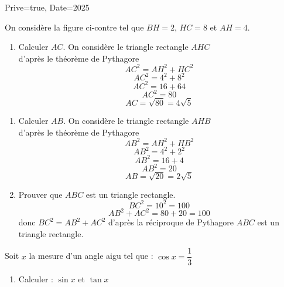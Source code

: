 \documentclass[a4paper,12pt]{article}
\begin{document}
\begin{Maquette}[Exam]{Prive=true, Date=2025}
\begin{exercice}[BaremeDetaille]
On considère la figure ci-contre tel que $BH=2$, $HC=8$ et $AH=4$.
\vspace*{3mm}

\begin{minipage}{.7\linewidth}
\begin{enumerate}
\item{} Calculer $AC$.\newline
On considère le triangle rectangle $AHC$\\
d'après le théorème de Pythagore\\
$$AC^{2}=AH^{2}+HC^{2}$$
$$AC^{2}=4^{2}+8^{2}$$
$$AC^{2}=16+64$$
$$AC^{2}=80$$
$$AC=\sqrt{80}=4\sqrt{5}$$
\end{enumerate}
\end{minipage}%
\begin{minipage}{.3\linewidth}
\end{minipage}%
\begin{enumerate}[start=2]
\item{} Calculer $AB$.
On considère le triangle rectangle $AHB$\\
d'après le théorème de Pythagore\\
$$AB^{2}=AH^{2}+HB^{2}$$
$$AB^{2}=4^{2}+2^{2}$$
$$AB^{2}=16+4$$
$$AB^{2}=20$$
$$AB=\sqrt{20}=2\sqrt{5}$$
\item{} Prouver que $ABC$ est un triangle rectangle.
$$BC^{2}=10^{2}=100$$
$$AB^{2}+AC^{2}=80+20=100$$
donc $BC^{2}=AB^{2}+AC^{2}$ d'après la réciproque de Pythagore $ABC$ est un triangle rectangle.
\end{enumerate}
\end{exercice}

\begin{exercice}[BaremeDetaille]
Soit $x$ la mesure d'un angle aigu tel que : $\cos x =\dfrac{1}{3}$
\begin{enumerate}
\item{} Calculer : $\sin x$ et $\tan x$\vspace{5mm}


\end{enumerate}
\end{exercice}
\end{Maquette}
\end{document}
